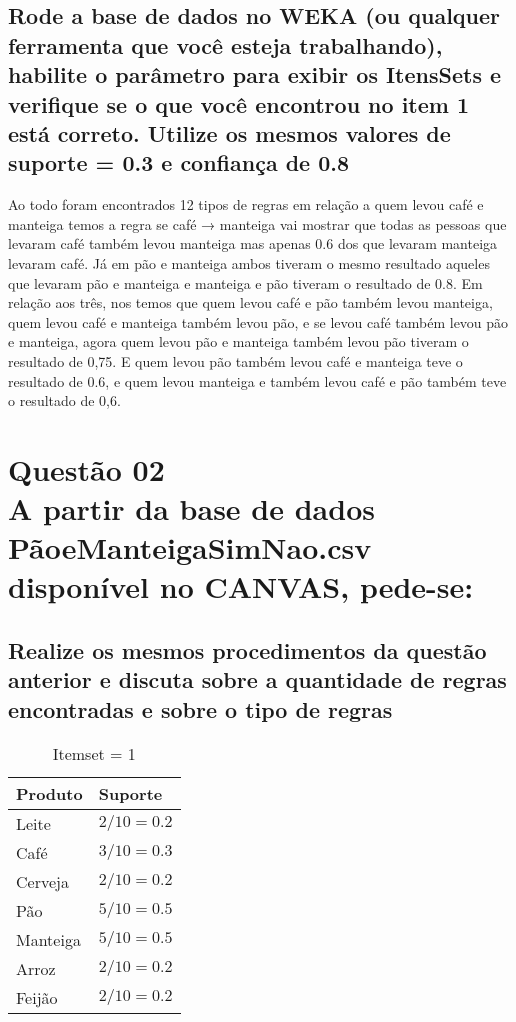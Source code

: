 \documentclass[12pt]{article}
\begin{document}
\subsection{Rode a base de dados no WEKA (ou qualquer ferramenta que você esteja trabalhando), habilite o parâmetro para exibir os ItensSets e verifique se o que você encontrou no item 1 está correto. Utilize os mesmos valores de suporte = 0.3 e confiança de 0.8}
Ao todo foram encontrados 12 tipos de regras em relação a quem levou café e manteiga temos a regra se café → manteiga vai mostrar que todas as pessoas que levaram café também levou manteiga mas apenas 0.6 dos que levaram manteiga levaram café.
Já em pão e manteiga ambos tiveram o mesmo resultado aqueles que levaram pão e manteiga e manteiga e pão tiveram o resultado de 0.8.
Em relação aos três, nos temos que quem levou café e pão também levou manteiga, quem levou café e manteiga também levou pão, e se levou café também levou pão e manteiga, agora quem levou pão e manteiga também levou pão tiveram o resultado de 0,75.
E quem levou pão também levou café e manteiga teve o resultado de 0.6, e quem levou manteiga e também levou café e pão também teve o resultado de 0,6.

\section{Questão 02\\
  A partir da base de dados PãoeManteigaSimNao.csv disponível no CANVAS, pede-se:
 }
\subsection{Realize os mesmos procedimentos da questão anterior e discuta sobre a quantidade de regras encontradas e sobre o tipo de regras}
\begin{table}[h]
	\begin{center}

		\begin{tabular}{| l | l |}
			\hline
			\textbf{Produto} & \textbf{Suporte} \\ \hline
			Leite            & $2/10=0.2$       \\ \hline
			Café             & $3/10=0.3$       \\ \hline
			Cerveja          & $2/10=0.2$       \\ \hline
			Pão              & $5/10=0.5$       \\ \hline
			Manteiga         & $5/10=0.5$       \\ \hline
			Arroz            & $2/10=0.2$       \\ \hline
			Feijão           & $2/10=0.2$       \\ \hline
		\end{tabular}
		\caption{\label{tab:itemset1.1}Itemset = 1}
	\end{center}
\end{table}
\end{document}
